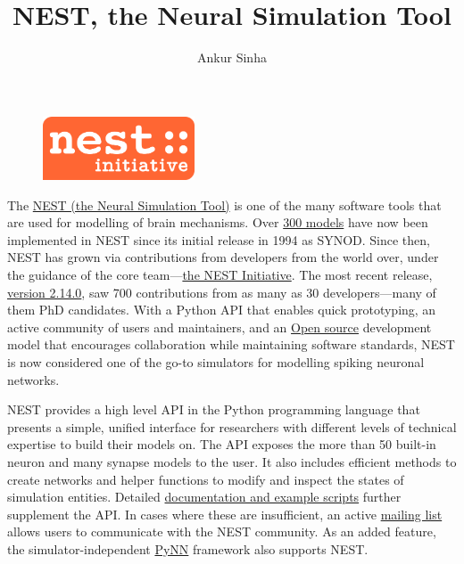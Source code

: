 \documentclass[12pt,a4paper]{article}
\title{NEST, the Neural Simulation Tool}
\author{Ankur Sinha}
\begin{document}
\maketitle
\begin{figure}[h]
  \centering
  \includegraphics[width=0.4\textwidth,keepaspectratio]{nest-initiative.png}
\end{figure}
The \href{http://www.nest-simulator.org}{NEST (the Neural Simulation Tool)} is one of the many software tools that are used for modelling of brain mechanisms.
Over \href{http://www.nest-simulator.org/publications/}{300 models} have now been implemented in NEST since its initial release in 1994 as SYNOD\@.
Since then, NEST has grown via contributions from developers from the world over, under the guidance of the core team---\href{http://www.nest-initiative.org/membership/}{the NEST Initiative}.
The most recent release, \href{https://github.com/nest/nest-simulator/releases/tag/v2.14.0 }{version 2.14.0}, saw 700 contributions from as many as 30 developers---many of them PhD candidates.
With a Python API that enables quick prototyping, an active community of users and maintainers, and an \href{https://en.wikipedia.org/wiki/Open-source_model}{Open source} development model that encourages collaboration while maintaining software standards, NEST is now considered one of the go-to simulators for modelling spiking neuronal networks.

NEST provides a high level API in the Python programming language that presents a simple, unified interface for researchers with different levels of technical expertise to build their models on.
The API exposes the more than 50 built-in neuron and many synapse models to the user.
It also includes efficient methods to create networks and helper functions to modify and inspect the states of simulation entities.
Detailed \href{http://nest-simulator.org/documentation/}{documentation and example scripts} further supplement the API\@.
In cases where these are insufficient, an active \href{http://mail.nest-initiative.org/cgi-bin/mailman/listinfo/nest_user}{mailing list} allows users to communicate with the NEST community.
As an added feature, the simulator-independent \href{http://neuralensemble.org/PyNN/}{PyNN} framework also supports NEST\@.
\end{document}
